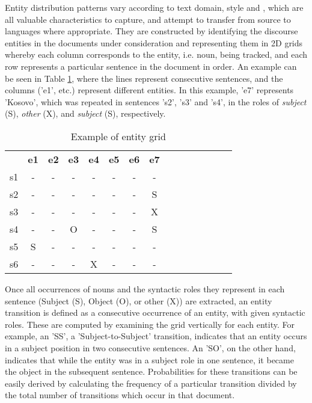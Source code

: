 \documentclass[output=paper]{langsci/langscibook.cls}
\begin{document}
Entity distribution patterns vary according to text domain, style and , which are all valuable characteristics to capture, and attempt to transfer from source to  languages where appropriate. 
They are constructed by identifying the discourse entities in the documents under consideration and representing them in 2D grids whereby each column corresponds to the entity, i.e. noun, being tracked, and each row represents a particular sentence in the document in order. An example can be seen in Table \ref{grid-table}, where the lines represent consecutive sentences, and the columns ('e1', etc.) represent different entities. In this example, 'e7' represents 'Kosovo', which was repeated in sentences 's2', 's3' and 's4', in the roles of {\em subject} (S), {\em other} (X), and {\em subject} (S), respectively.

\begin{table}
\footnotesize

\begin{tabular}{|c|c|c|c|c|c|c|c|c|c|c|c|c|c|c|}
\hline \bf & \bf e1 & \bf e2 & \bf e3 & \bf e4 & \bf e5 & \bf e6 & \bf e7 \\  
s1&-&-&-&-&-&-&- \\
s2&-&-&-&-&-&-&S \\
s3&-&-&-&-&-&-&X \\
s4&-&-&O&-&-&-&S \\
s5&S&-&-&-&-&-&- \\
s6&-&-&-&X&-&-&- \\ \hline
\end{tabular}

\caption{\label{grid-table} Example of entity grid}
\end{table}


Once all occurrences of nouns and the syntactic roles they represent in each sentence (Subject (S), Object (O), or other (X)) are extracted, an {\sc entity transition} is defined as a consecutive occurrence of an entity, with given syntactic roles. These are computed by examining the grid vertically for each entity. For example, an 'SS', a 'Subject-to-Subject' transition, indicates that an entity occurs in a subject position in two consecutive sentences. An 'SO', on the other hand, indicates that while the entity was in a subject role in one sentence, it became the object in the subsequent sentence.
Probabilities for these transitions can be easily derived by calculating the frequency of a particular transition divided by the total number of transitions which occur in that document. 
\end{document}
